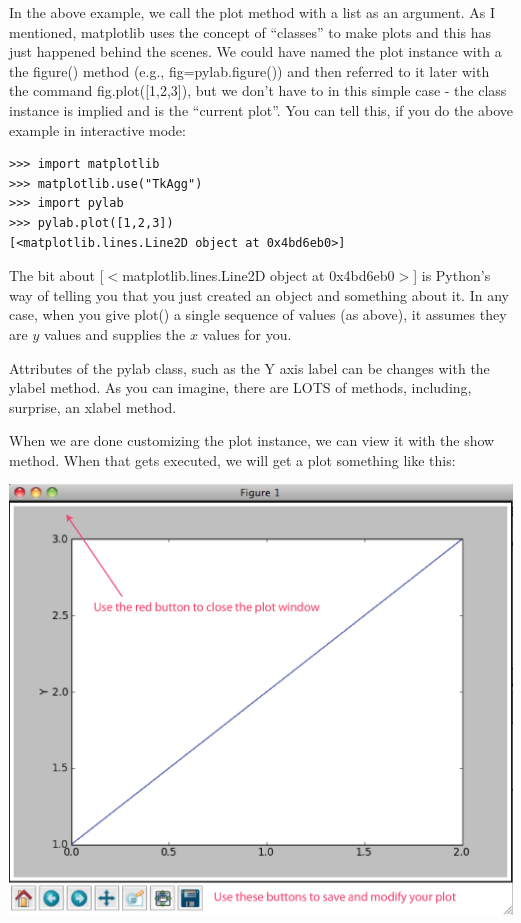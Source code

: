 \documentclass[11pt]{book}
\begin{document}
{{{In the above example, we call the {\color{blue}plot} method with a list as an argument.  As I mentioned, {\color{blue}matplotlib} uses the concept of ``classes'' to make plots and this has just happened behind the scenes. We could have named the plot instance with a the {\color{blue}figure()} method (e.g.,  {\color{blue}fig=pylab.figure()}) and then referred to it later with the command  {\color{blue}fig.plot([1,2,3])}, but we don't have to in this simple case - the class instance is implied and is the ``current plot''.  You can tell this, if you do the above example in interactive mode:

{ \color{blue}\begin{verbatim}
>>> import matplotlib
>>> matplotlib.use("TkAgg")
>>> import pylab
>>> pylab.plot([1,2,3])
[<matplotlib.lines.Line2D object at 0x4bd6eb0>]
\end{verbatim}}
\noindent The bit about {\color{blue}[$<$matplotlib.lines.Line2D object at 0x4bd6eb0$>$]} is Python's way of telling you that you just created an object and something about it.   
In any case, when you give {\color{blue} plot()} a single sequence of values (as above), it assumes they are $y$ values and supplies the $x$ values for you.  

Attributes of the {\color{blue}pylab} class, such as the Y axis label can be changes with the {\color{blue}ylabel} method.  As you can imagine, there are LOTS of methods, including, surprise, an {\color{blue}xlabel} method.  

When we are done customizing the plot instance, we can view it with the {\color{blue}show} method.  When that gets executed, we will get a plot something like this:

   \includegraphics[width=15cm]{EPSfiles/matplotlib1.eps} 
   
}}}
\end{document}
